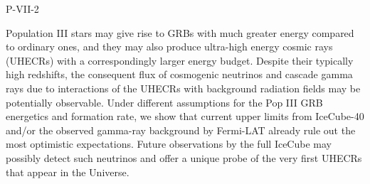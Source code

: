 P-VII-2


\bigskip



\bigskip

\noindent Population III stars may give rise to GRBs with much greater energy compared to ordinary ones, and they may also produce ultra-high energy cosmic rays (UHECRs) with a correspondingly larger energy budget. Despite their typically high redshifts, the consequent flux of cosmogenic neutrinos and cascade gamma rays due to interactions of the UHECRs with background radiation fields may be potentially observable. Under different assumptions for the Pop III GRB energetics and formation rate, we show that current upper limits from IceCube-40 and/or the observed gamma-ray background by Fermi-LAT already rule out the most optimistic expectations. Future observations by the full IceCube may possibly detect such neutrinos and offer a unique probe of the very first UHECRs that appear in the Universe.


